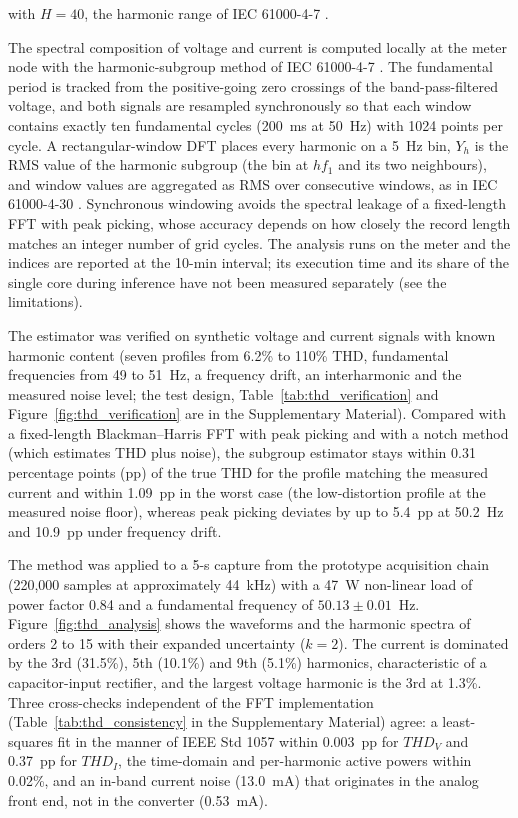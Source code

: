 \documentclass[fleqn,10pt]{wlscirep}
\begin{document}
with $H = 40$, the harmonic range of IEC 61000-4-7 \cite{iec61000_4_7}.

The spectral composition of voltage and current is computed locally at the meter node \cite{shang2021achieving} with the harmonic-subgroup method of IEC 61000-4-7 \cite{iec61000_4_7}. The fundamental period is tracked from the positive-going zero crossings of the band-pass-filtered voltage, and both signals are resampled synchronously so that each window contains exactly ten fundamental cycles (200~ms at 50~Hz) with 1024 points per cycle. A rectangular-window DFT places every harmonic on a 5~Hz bin, $Y_h$ is the RMS value of the harmonic subgroup (the bin at $h f_1$ and its two neighbours), and window values are aggregated as RMS over consecutive windows, as in IEC 61000-4-30 \cite{iec61000_4_30}. Synchronous windowing avoids the spectral leakage of a fixed-length FFT with peak picking, whose accuracy depends on how closely the record length matches an integer number of grid cycles. The analysis runs on the meter and the indices are reported at the 10-min interval; its execution time and its share of the single core during inference have not been measured separately (see the limitations).

The estimator was verified on synthetic voltage and current signals with known harmonic content (seven profiles from 6.2\% to 110\% THD, fundamental frequencies from 49 to 51~Hz, a frequency drift, an interharmonic and the measured noise level; the test design, Table~\ref{tab:thd_verification} and Figure~\ref{fig:thd_verification} are in the Supplementary Material). Compared with a fixed-length Blackman--Harris FFT with peak picking and with a notch method (which estimates THD plus noise), the subgroup estimator stays within 0.31 percentage points (pp) of the true THD for the profile matching the measured current and within 1.09~pp in the worst case (the low-distortion profile at the measured noise floor), whereas peak picking deviates by up to 5.4~pp at 50.2~Hz and 10.9~pp under frequency drift.



The method was applied to a 5-s capture from the prototype acquisition chain (220{,}000 samples at approximately 44~kHz) with a 47~W non-linear load of power factor 0.84 and a fundamental frequency of $50.13 \pm 0.01$~Hz. Figure~\ref{fig:thd_analysis} shows the waveforms and the harmonic spectra of orders 2 to 15 with their expanded uncertainty ($k = 2$). The current is dominated by the 3rd (31.5\%), 5th (10.1\%) and 9th (5.1\%) harmonics, characteristic of a capacitor-input rectifier, and the largest voltage harmonic is the 3rd at 1.3\%. Three cross-checks independent of the FFT implementation (Table~\ref{tab:thd_consistency} in the Supplementary Material) agree: a least-squares fit in the manner of IEEE Std 1057 \cite{ieee1057} within 0.003~pp for $THD_V$ and 0.37~pp for $THD_I$, the time-domain and per-harmonic active powers within 0.02\%, and an in-band current noise (13.0~mA) that originates in the analog front end, not in the converter (0.53~mA).
\end{document}
